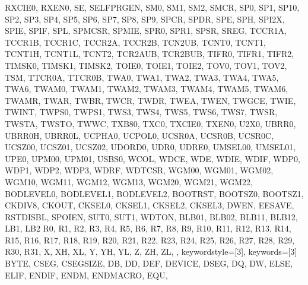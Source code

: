 {{                RXCIE0, RXEN0, 
                SE, SELFPRGEN, SM0, SM1, SM2, SMCR, SP0, SP1, 
                SP10, 
                SP2, SP3, SP4, SP5, SP6, SP7, SP8, SP9, 
                SPCR, SPDR, SPE, SPH, SPI2X, SPIE, SPIF, SPL,
                SPMCSR, SPMIE, SPR0, SPR1, SPSR, SREG, 
                TCCR1A, TCCR1B, TCCR1C, TCCR2A, TCCR2B, TCN2UB,
                TCNT0, TCNT1, TCNT1H, TCNT1L, TCNT2, TCR2AUB, 
                TCR2BUB, TIFR0, TIFR1, TIFR2, TIMSK0, TIMSK1,
                TIMSK2, TOIE0, TOIE1, TOIE2, TOV0, TOV1, TOV2, 
                TSM, TTCR0A, TTCR0B, TWA0, TWA1, TWA2, TWA3, 
                TWA4, TWA5, TWA6, TWAM0, TWAM1, TWAM2, TWAM3, 
                TWAM4, TWAM5, TWAM6, TWAMR, TWAR, TWBR, TWCR, 
                TWDR, TWEA, TWEN, TWGCE, TWIE, TWINT, 
                TWPS0, TWPS1, TWS3, TWS4, TWS5, TWS6, TWS7, 
                TWSR, TWSTA, TWSTO, TWWC, TXB80, TXC0, TXCIE0, 
                TXEN0, 
                U2X0, UBRR0, UBRR0H, UBRR0L, UCPHA0, UCPOL0, 
                UCSR0A, UCSR0B, UCSR0C, UCSZ00, UCSZ01, UCSZ02,
                UDORD0, UDR0, UDRE0, UMSEL00, UMSEL01, UPE0, 
                UPM00, UPM01, USBS0, 
                WCOL, WDCE, WDE, WDIE, WDIF, WDP0, WDP1, WDP2, 
                WDP3, WDRF, WDTCSR, WGM00, WGM01, WGM02, WGM10,
                WGM11, WGM12, WGM13, WGM20, WGM21, WGM22, 
                BODLEVEL0, BODLEVEL1, BODLEVEL2, 
                BOOTRST, BOOTSZ0, BOOTSZ1, 
                CKDIV8, CKOUT, 
                CKSEL0, CKSEL1, CKSEL2, CKSEL3, 
                DWEN, EESAVE, RSTDISBL, SPOIEN, 
                SUT0, SUT1, WDTON, 
                BLB01, BLB02, BLB11, BLB12,
                LB1, LB2
                R0,  R1,  R2,  R3,  R4,  R5,  R6,  R7,  R8, 
                R9,  R10, R11, R12, R13, R14, R15, R16, R17, 
                R18, R19, R20, R21, R22, R23, R24, R25, R26, 
                R27, R28, R29, R30, R31, 
                X, XH, XL, Y, YH, YL, Z, ZH, ZL,
                },  
% 
%
  keywordstyle=[3]\color{arduinoOrange},
  keywords=[3]{  %
                BYTE,
                CSEG, CSEGSIZE,
                DB, DD, DEF, DEVICE, DSEG, DQ, DW,
                ELSE, ELIF, ENDIF, ENDM, ENDMACRO, EQU, 
}}
